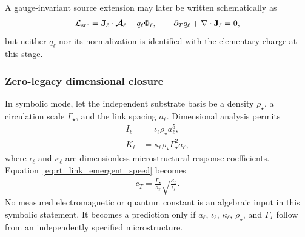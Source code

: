 A gauge-invariant source extension may later be written schematically as
\begin{align}
    \mathcal L_{\rm src}
    =
    \mathbf J_\ell\cdot\boldsymbol{\mathcal A}_\ell
    -
    q_\ell\Phi_\ell,
    \qquad
    \partial_Tq_\ell+\nabla\cdot\mathbf J_\ell=0,
    \label{eq:rt_link_source_extension}
\end{align}
but neither $q_\ell$ nor its normalization is identified with the elementary
charge at this stage.

\subsubsection{Zero-legacy dimensional closure}

In symbolic mode, let the independent substrate basis be a density
\(\rho_\star\), a circulation scale \(\Gamma_\star\), and the link spacing
\(a_\ell\).  Dimensional analysis permits
\begin{align}
    I_\ell
    &=
    \iota_\ell\rho_\star a_\ell^5,
    \\
    K_\ell
    &=
    \kappa_\ell\rho_\star\Gamma_\star^2a_\ell,
    \label{eq:rt_link_zero_legacy_coefficients}
\end{align}
where \(\iota_\ell\) and \(\kappa_\ell\) are dimensionless microstructural
response coefficients.  Equation~\eqref{eq:rt_link_emergent_speed} becomes
\begin{align}
    \boxed{
    c_T
    =
    \frac{\Gamma_\star}{a_\ell}
    \sqrt{\frac{\kappa_\ell}{\iota_\ell}}
    }.
    \label{eq:rt_link_zero_legacy_speed}
\end{align}
No measured electromagnetic or quantum constant is an algebraic input in this
symbolic statement.  It becomes a prediction only if \(a_\ell\),
\(\iota_\ell\), \(\kappa_\ell\), \(\rho_\star\), and \(\Gamma_\star\) follow
from an independently specified microstructure.


